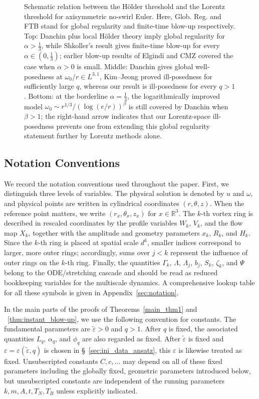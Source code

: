 \documentclass[reqno,11pt]{amsart}
\begin{document}
\begin{figure}[t]
\begin{tikzpicture}
\end{tikzpicture}
\caption{Schematic relation between the H\"older threshold and the Lorentz threshold for axisymmetric no-swirl Euler. Here, Glob. Reg. and FTB stand for global regularity and finite-time blow-up respectively.
Top: Danchin plus local H\"older theory imply global regularity for $\alpha>\frac13$, while Shkoller's result gives finite-time blow-up for every $\alpha\in(0,\frac13)$; earlier blow-up results of Elgindi and CMZ covered the case when $\alpha>0$ is small.
Middle: Danchin gives global well-posedness at $\omega_0/r\in L^{3,1}$, Kim--Jeong proved ill-posedness for sufficiently large $q$, whereas our result is ill-posedness for every $q>1$.
Bottom: at the borderline $\alpha=\frac13$, the logarithmically improved model $\omega_0\sim r^{1/3}/(\log(e/r))^\beta$ is still covered by Danchin when $\beta>1$; the right-hand arrow indicates that our Lorentz-space ill-posedness prevents one from extending this global regularity statement further by Lorentz methods alone.}
\label{Holder_Lorentz}
\end{figure}


\subsection{Notation Conventions}
\label{sec:out_paper_not}

We record the notation conventions used throughout the paper. First, we distinguish three levels of variables. The physical solution is denoted by $u$ and $\omega$, and physical points are written in cylindrical coordinates $(r,\theta,z)$. When the reference point matters, we write $(r_x,\theta_x,z_x)$ for $x\in\mathbb{R}^3$. The $k$-th vortex ring is described in rescaled coordinates by the profile variables $W_k$, $V_k$, and the flow map $X_k$, together with the amplitude and geometry parameters $x_k$, $R_k$, and $H_k$. Since the $k$-th ring is placed at spatial scale $d^k$, smaller indices correspond to larger, more outer rings; accordingly, sums over $j<k$ represent the influence of outer rings on the $k$-th ring. Finally, the quantities $\Gamma_k$, $\Lambda$, $\Lambda_j$, $b_j$, $S_k$, $\zeta_k$, and $\Psi$ belong to the ODE/stretching cascade and should be read as reduced bookkeeping variables for the multiscale dynamics. A comprehensive lookup table for all these symbols is given in Appendix~\ref{sec:notation}.

In the main parts of the proofs of Theorems~\ref{main_thm1} and ~\ref{thm:instant_blow-up}, we use the following convention for constants. The fundamental parameters are $\tilde\varepsilon>0$ and $q>1$. After $q$ is fixed, the associated quantities $L_q$, $\alpha_q$, and $\phi_q$ are also regarded as fixed. After $\tilde\varepsilon$ is fixed and $\varepsilon=\varepsilon(\tilde\varepsilon,q)$ is chosen in \S~\ref{sec:ini_data_ansatz}, this $\varepsilon$ is likewise treated as fixed. Unsubscripted constants $C,c,\dots$ may depend on all of these fixed parameters including the globally fixed, geometric parameters introduced below, but unsubscripted constants are independent of the running parameters $k,m,A,t,T_N,T_B$ unless explicitly indicated.
\end{document}
